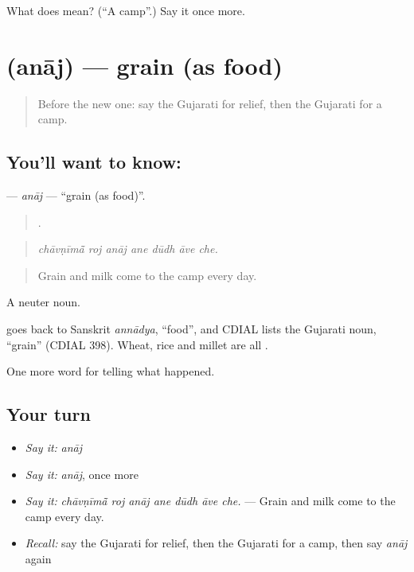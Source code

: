 \begin{tcolorbox}[breakable,colback=teal!4,colframe=teal!35!black,title={Before you move on}]
What does  mean? (\textquotedblleft{}A camp\textquotedblright{}.) Say it once more.
\end{tcolorbox}
\section[\texorpdfstring{\gu{અનાજ} (anāj)}{અનાજ (anāj)}]{ (anāj) — grain (as food)}

\label{lesson:GU-C306-anaj}



\begin{quote}
Before the new one: say the Gujarati for relief, then the Gujarati for a camp.
\end{quote}

\subsection*{You'll want to know: }
\textbf{} — \emph{anāj} — \textquotedblleft{}grain (as food)\textquotedblright{}.

\begin{quote}
      .
\end{quote}

\begin{quote}
\emph{chāvṇīmā̃ roj anāj ane dūdh āve che.}
\end{quote}

\begin{quote}
Grain and milk come to the camp every day.
\end{quote}

A neuter noun.

\begin{cousinweb}
goes back to Sanskrit \emph{annādya}, \textquotedblleft{}food\textquotedblright{}, and CDIAL lists the Gujarati noun, \textquotedblleft{}grain\textquotedblright{} (CDIAL 398). Wheat, rice and millet are all \textbf{}.
\end{cousinweb}

\begin{grammarlens}[title={What you've built}]
One more word for telling what happened.
\end{grammarlens}

\subsection*{Your turn}
\begin{itemize}
\raggedright
  \item \emph{Say it:} \emph{anāj}
  \item \emph{Say it:} \emph{anāj}, once more
  \item \emph{Say it:} \emph{chāvṇīmā̃ roj anāj ane dūdh āve che.} — Grain and milk come to the camp every day.
  \item \emph{Recall:} say the Gujarati for relief, then the Gujarati for a camp, then say \emph{anāj} again
\end{itemize}

